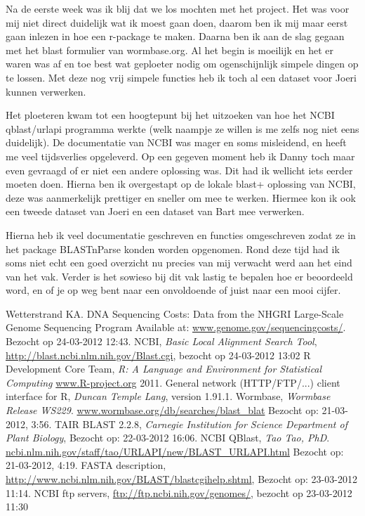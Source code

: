 \documentclass[10pt]{article}
\begin{document}
Na de eerste week was ik blij dat we los mochten met het project. Het was voor mij niet direct duidelijk wat ik moest gaan doen, daarom ben ik mij maar eerst gaan inlezen in hoe een r-package te maken. Daarna ben ik aan de slag gegaan met het blast formulier van wormbase.org. Al het begin is moeilijk en het er waren was af en toe best wat geploeter nodig om ogenschijnlijk simpele dingen op te lossen. Met deze nog vrij simpele functies heb ik toch al een dataset voor Joeri kunnen verwerken.

Het ploeteren kwam tot een hoogtepunt bij het uitzoeken van hoe het NCBI qblast/urlapi programma werkte (welk naampje ze willen is me zelfs nog niet eens duidelijk). De documentatie van NCBI was mager en soms misleidend, en heeft me veel tijdsverlies opgeleverd. Op een gegeven moment heb ik Danny toch maar even gevraagd of er niet een andere oplossing was. Dit had ik wellicht iets eerder moeten doen.
Hierna ben ik overgestapt op de lokale blast+ oplossing van NCBI, deze was aanmerkelijk prettiger en sneller om mee te werken. Hiermee kon ik ook een tweede dataset van Joeri en een dataset van Bart mee verwerken. 

Hierna heb ik veel documentatie geschreven en functies omgeschreven zodat ze in het package BLASTnParse konden worden opgenomen. Rond deze tijd had ik soms niet echt een goed overzicht nu precies van mij verwacht werd aan het eind van het vak. Verder is het sowieso bij dit vak lastig te bepalen hoe er beoordeeld word, en of je op weg bent naar een onvoldoende of juist naar een mooi cijfer. 

\begin{thebibliography}{9}
    Wetterstrand KA. DNA Sequencing Costs: Data from the NHGRI Large-Scale Genome Sequencing Program Available at: \url{www.genome.gov/sequencingcosts/}. Bezocht op 24-03-2012 12:43.
    NCBI, \emph{Basic Local Alignment Search Tool}, \url{http://blast.ncbi.nlm.nih.gov/Blast.cgi}, bezocht op 24-03-2012 13:02
    R Development Core Team, \emph{R: A Language and Environment for Statistical Computing}
    \url{www.R-project.org} 2011.
    General network (HTTP/FTP/...) client interface for R, \emph{Duncan Temple Lang}, version 1.91.1.
    Wormbase, \emph{Wormbase Release WS229}. \url{www.wormbase.org/db/searches/blast_blat} Bezocht op: 21-03-2012, 3:56.
    TAIR BLAST 2.2.8, \emph{Carnegie Institution for Science Department of Plant Biology}, Bezocht op: 22-03-2012 16:06.
    NCBI QBlast, \emph{Tao Tao, PhD}. \url{ncbi.nlm.nih.gov/staff/tao/URLAPI/new/BLAST_URLAPI.html} Bezocht op: 21-03-2012, 4:19.
    FASTA description, \url{http://www.ncbi.nlm.nih.gov/BLAST/blastcgihelp.shtml}, Bezocht op: 23-03-2012 11:14.
    NCBI ftp servers, \url{ftp://ftp.ncbi.nih.gov/genomes/}, bezocht op 23-03-2012 11:30
\end{thebibliography}
\end{document}

